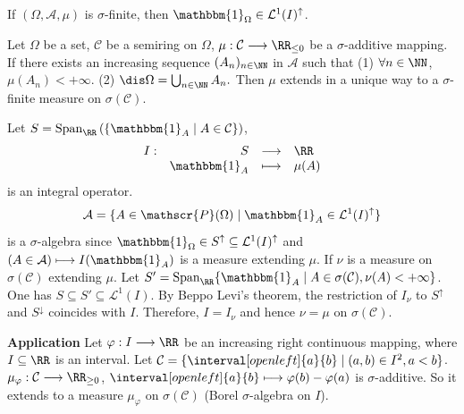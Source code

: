 \begin{remark}
    If $(\Omega,\mathcal{A},\mu)$ is $\sigma$-finite, then $\mathbbm{1}_{\Omega}\in \mathcal{L}^1(I)^\uparrow$.
\end{remark}
\begin{theoremenv}
    Let $\Omega$ be a set, $\mathcal{C}$ be a semiring on $\Omega$, $\mu:\mathcal{C}\longrightarrow \RR_{\le 0}$ be a $\sigma$-additive mapping. If there exists an increasing sequence $(A_n)_{n\in \NN}$ in $\mathcal{A}$ such that
    \newline
    (1) $\forall n\in \NN$, $\mu(A_n)<+\infty$.
    \newline
    (2) $\dis \Omega=\bigcup_{n\in \NN}A_n.$
    \newline
    Then $\mu$ extends in a unique way to a $\sigma$-finite measure on $\sigma(\mathcal{C})$.
\end{theoremenv}
\begin{proofenv}
    Let $S=\mathrm{Span}_{\RR}\left(\{\mathbbm{1}_A\mid A\in \mathcal{C}\}\right)$,
    $$\begin{array}{rrcl}
        I:&S&\longrightarrow &\RR\\
        & \mathbbm{1}_A &\longmapsto &\mu(A)
    \end{array}$$
    is an integral operator.
    $$ \mathcal{A}=\{A\in \mathscr{P}(\Omega)\mid \mathbbm{1}_{A} \in \mathcal{L}^1(I)^\uparrow\}$$
    is a $\sigma$-algebra since $\mathbbm{1}_{\Omega}\in S^\uparrow \subseteq \mathcal{L}^1(I)^\uparrow$ and $(A\in \mathcal{A})\longmapsto I(\mathbbm{1}_A)$ is a measure extending $\mu$.
    If $\nu$ is a measure on $\sigma(\mathcal{C})$ extending $\mu$.
    Let $S'=\mathrm{Span}_{\RR}\{\mathbbm{1}_A\mid A\in \sigma(\mathcal{C}), \nu(A)<+\infty\}$. One has $S\subseteq S'\subseteq \mathcal{L}^1(I)$.
    By Beppo Levi's theorem, the restriction of $I_{\nu}$ to $S^\uparrow$ and $S^\downarrow$ coincides with $I$. Therefore, $I=I_\nu$ and hence $\nu=\mu$ on $\sigma(\mathcal{C})$.
\end{proofenv}
\begin{box2}
\textbf{Application}
\newline
Let $\varphi:I\longrightarrow \RR$ be an increasing right continuous mapping, where $I\subseteq \RR$ is an interval. Let $\mathcal{C}=\{\interval[open left]{a}{b}\mid (a,b)\in I^2, a<b\}$.
$\mu_\varphi:\mathcal{C}\longrightarrow \RR_{\ge 0}$, $\interval[open left]{a}{b}\longmapsto \varphi(b)-\varphi(a)$ is $\sigma$-additive. So it extends to a measure $\mu_\varphi$ on $\sigma(\mathcal{C})$ (Borel $\sigma$-algebra on $I$).
\end{box2}

